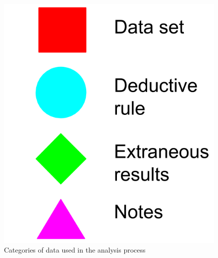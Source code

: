 \begin{figure}
  \includegraphics[scale=0.6]{figures/data_key}
  \caption{Categories of data used in the analysis process}
  \label{data_key}
\end{figure}

